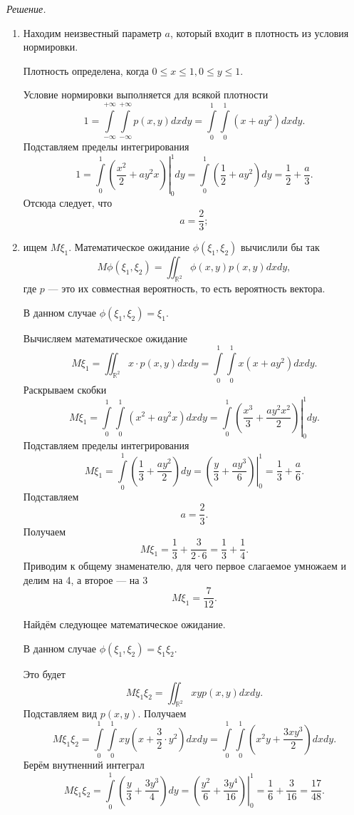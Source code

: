 \textit{Решение.}
\begin{enumerate}[label=\alph*)]
\item Находим неизвестный параметр $a$, который входит в плотность из условия нормировки.

Плотность определена, когда $0 \leq x \leq 1, 0 \leq y \leq 1$.

Условие нормировки выполняется для всякой плотности
$$1 =
\int \limits_{- \infty }^{+ \infty } \int \limits_{- \infty }^{+ \infty } p \left( x, y \right) dxdy =
\int \limits_0^1 \int \limits_0^1 \left( x+ay^2 \right) dxdy.$$
Подставляем пределы интегрирования
$$1 =
\left. \int \limits_0^1 \left( \frac{x^2}{2} + ay^2 x \right) \right|_0^1 dy =
\int \limits_0^1 \left( \frac{1}{2} + ay^2 \right) dy =
\frac{1}{2} + \frac{a}{3}.$$
Отсюда следует, что
$$a =
\frac{2}{3};$$
\item ищем $M \xi_1$.
Математическое ожидание $ \phi \left( \xi_1, \xi_2 \right) $ вычислили бы так
$$M \phi \left( \xi_1, \xi_2 \right) =
\iint_{ \mathbb{R}^2} \phi \left( x, y \right) p \left( x, y \right) dxdy,$$
где $p$ --- это их совместная вероятность, то есть вероятность вектора.

В данном случае $ \phi \left( \xi_1, \xi_2 \right) = \xi_1$.

Вычисляем математическое ожидание
$$M \xi_1 =
\iint_{ \mathbb{R}^2} x \cdot p \left( x, y \right) dxdy =
\int \limits_0^1 \int \limits_0^1 x \left( x + ay^2 \right) dxdy.$$
Раскрываем скобки
$$M \xi_1 =
\int \limits_0^1 \int \limits_0^1 \left( x^2 + ay^2 x \right) dxdy =
\left. \int \limits_0^1 \left( \frac{x^3}{3} + \frac{ay^2 x^2}{2} \right) \right|_0^1 dy.$$
Подставляем пределы интегрирования
$$M \xi_1 =
\int \limits_0^1 \left( \frac{1}{3} + \frac{ay^2}{2} \right) dy =
\left. \left( \frac{y}{3} + \frac{ay^3}{6} \right) \right|_0^1 =
\frac{1}{3} + \frac{a}{6}.$$
Подставляем
$$a =
\frac{2}{3}.$$
Получаем
$$M \xi_1 =
\frac{1}{3} + \frac{3}{2 \cdot 6} =
\frac{1}{3} + \frac{1}{4}.$$
Приводим к общему знаменателю, для чего первое слагаемое умножаем и делим на 4, а второе --- на 3
$$M \xi_1 =
\frac{7}{12}.$$

Найдём следующее математическое ожидание.

В данном случае $ \phi \left( \xi_1, \xi_2 \right) = \xi_1 \xi_2$.

Это будет
$$M \xi_1 \xi_2 =
\iint_{ \mathbb{R}^2} xyp \left( x, y \right) dxdy.$$
Подставляем вид $p \left( x, y \right) $.
Получаем
$$M \xi_1 \xi_2 =
\int \limits_0^1 \int \limits_0^1 xy \left( x + \frac{3}{2} \cdot y^2 \right) dxdy =
\int \limits_0^1 \int \limits_0^1 \left( x^2 y + \frac{3xy^3}{2} \right) dxdy.$$
Берём внутненний интеграл
$$M \xi_1 \xi_2 =
\int \limits_0^1 \left( \frac{y}{3} + \frac{3y^3}{4} \right) dy =
\left. \left( \frac{y^2}{6} + \frac{3y^4}{16} \right) \right|_0^1 =
\frac{1}{6} + \frac{3}{16} =
\frac{17}{48}.$$


\end{enumerate}
